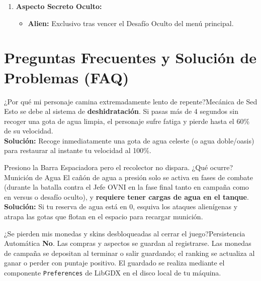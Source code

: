 \documentclass[11pt,a4paper]{article}
\begin{document}
\begin{enumerate}[label=\textbf{\Alph*.}, itemsep=0.8em]
    \item \textbf{Aspecto Secreto Oculto:}
    \begin{itemize}
        \item \textbf{Alien:} Exclusivo tras vencer el Desafío Oculto del menú principal.
    \end{itemize}
\end{enumerate}

\newpage

\begingroup
\small
\section{Preguntas Frecuentes y Solución de Problemas (FAQ)}
\label{sec:faq}

\begin{tarjetaitem}{¿Por qué mi personaje camina extremadamente lento de repente?}{Mecánica de Sed}
    Esto se debe al sistema de \textbf{deshidratación}. Si pasas más de 4 segundos sin recoger una gota de agua limpia, el personaje sufre fatiga y pierde hasta el 60\% de su velocidad. \\
    \textbf{Solución:} Recoge inmediatamente una gota de agua celeste (o agua doble/oasis) para restaurar al instante tu velocidad al 100\%.
\end{tarjetaitem}

\vspace{0.4cm}

\begin{tarjetaitem}{Presiono la Barra Espaciadora pero el recolector no dispara. ¿Qué ocurre?}{Munición de Agua}
    El cañón de agua a presión solo se activa en fases de combate (durante la batalla contra el Jefe OVNI en la fase final tanto en campaña como en versus o desafío oculto), y \textbf{requiere tener cargas de agua en el tanque}. \\
    \textbf{Solución:} Si tu reserva de agua está en 0, esquiva los ataques alienígenas y atrapa las gotas que flotan en el espacio para recargar munición.
\end{tarjetaitem}

\vspace{0.4cm}

\begin{tarjetaitem}{¿Se pierden mis monedas y skins desbloqueadas al cerrar el juego?}{Persistencia Automática}
    \textbf{No}. Las compras y aspectos se guardan al registrarse. Las monedas de campaña se depositan al terminar o salir guardando; el ranking se actualiza al ganar o perder con puntaje positivo. El guardado se realiza mediante el componente \texttt{Preferences} de LibGDX en el disco local de tu máquina.
\end{tarjetaitem}
\end{document}
